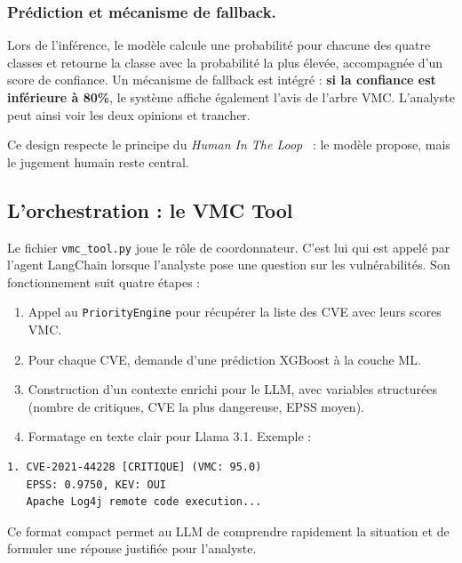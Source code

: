 \documentclass[runningheads]{llncs}
\begin{document}
\subsubsection{Prédiction et mécanisme de fallback.}

Lors de l'inférence, le modèle calcule une probabilité pour chacune des quatre classes et retourne la classe avec la probabilité la plus élevée, accompagnée d'un score de confiance. Un mécanisme de fallback est intégré : \textbf{si la confiance est inférieure à 80\%}, le système affiche également l'avis de l'arbre VMC. L'analyste peut ainsi voir les deux opinions et trancher.

Ce design respecte le principe du \textit{Human In The Loop}~\cite{cyberally2024} : le modèle propose, mais le jugement humain reste central.

\subsection{L'orchestration : le VMC Tool}

Le fichier \texttt{vmc\_tool.py} joue le rôle de coordonnateur. C'est lui qui est appelé par l'agent LangChain lorsque l'analyste pose une question sur les vulnérabilités. Son fonctionnement suit quatre étapes :

\begin{enumerate}
    \item Appel au \texttt{PriorityEngine} pour récupérer la liste des CVE avec leurs scores VMC.
    \item Pour chaque CVE, demande d'une prédiction XGBoost à la couche ML.
    \item Construction d'un contexte enrichi pour le LLM, avec variables structurées (nombre de critiques, CVE la plus dangereuse, EPSS moyen).
    \item Formatage en texte clair pour Llama 3.1. Exemple :
\end{enumerate}

\begin{verbatim}
1. CVE-2021-44228 [CRITIQUE] (VMC: 95.0)
   EPSS: 0.9750, KEV: OUI
   Apache Log4j remote code execution...
\end{verbatim}

Ce format compact permet au LLM de comprendre rapidement la situation et de formuler une réponse justifiée pour l'analyste.

\end{document}
